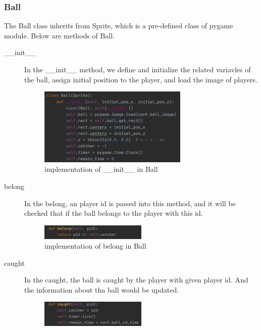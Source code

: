 \documentclass[14pt]{extarticle}
\begin{document}
\subsubsection{Ball}
The Ball class inherits from Sprite, which is a pre-defined class of pygame module. Below are methods of Ball.
\begin{description}
	\item[\_\_init\_\_]
	In the \_\_init\_\_ method, we define and initialize the related variavles of the ball, assign initial position to the player, and load the image of players.
	\begin{figure}[H]
		\begin{center}
			\includegraphics[width=0.7\textwidth]{Ball_init}
			\caption{implementation of \_\_init\_\_ in Ball}
		\end{center}
	\end{figure}
	\item[belong]
	In the belong, an player id is passed into this method, and it will be checked that if the ball belongs to the player with this id. 
	\begin{figure}[H]
		\begin{center}
			\includegraphics[width=0.5\textwidth]{Ball_belong}
			\caption{implementation of belong in Ball}
		\end{center}
	\end{figure}
	\item[caught]
	In the caught, the ball is caught by the player with given player id. And the information about tha ball would be updated.
	\begin{figure}[H]
		\begin{center}
			\includegraphics[width=0.5\textwidth]{Ball_caught}

\end{center}
\end{figure}
\end{description}
\end{document}
